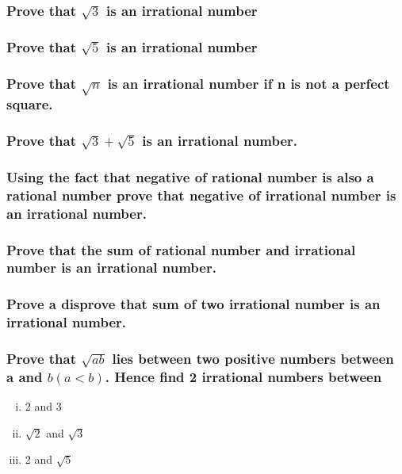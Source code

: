 \documentclass[a4paper,10pt]{article}
\begin{document}
\subsubsection{Prove that $\sqrt{3}$ is an irrational number}
\subsubsection{Prove that $\sqrt{5}$ is an irrational number}
\subsubsection{Prove that $\sqrt{n}$ is an irrational number if n is not a
perfect square.}
\subsubsection{Prove that $\sqrt{3}+\sqrt{5}$ is an irrational number.}
\subsubsection{Using the fact that negative of rational number is also a
rational number prove that
negative of irrational number is an irrational number.}
\subsubsection{Prove that the sum of rational number and irrational
number is an irrational number.}
\subsubsection{Prove a disprove that sum of two irrational number is an
irrational number.}
\subsubsection{Prove that $\sqrt{ab}$ lies between two positive numbers between a
and $b (a < b)$. Hence find 2
irrational numbers between}
\begin{multicols}{3}
\begin{enumerate}[(i)]
\item 2 and 3
\item $\sqrt{2}$ and $\sqrt{3}$
\item 2 and $\sqrt{5}$
\end{enumerate}
\end{multicols}
\end{document}
